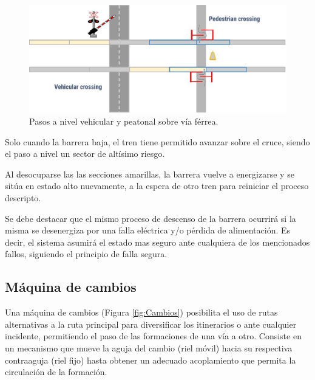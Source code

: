 			\begin{figure}[h!]
				\centering
				\includegraphics[scale=0.4]{./Figures/Paso a nivel}
				\caption{Pasos a nivel vehicular y peatonal sobre vía férrea.}
				\label{fig:Paso_a_nivel}
			\end{figure}
			
			Solo cuando la barrera baja, el tren tiene permitido avanzar sobre el cruce, siendo el paso a nivel un sector de altísimo riesgo.
			
			Al desocuparse las las secciones amarillas, la barrera vuelve a energizarse y se sitúa en estado alto nuevamente, a la espera de otro tren para reiniciar el proceso descripto.
						
			Se debe destacar que el mismo proceso de descenso de la barrera ocurrirá si la misma se desenergiza por una falla eléctrica y/o pérdida de alimentación. Es decir, el sistema asumirá el estado mas seguro ante cualquiera de los mencionados fallos, siguiendo el principio de falla segura.
		
		\subsection{Máquina de cambios}
			
			Una máquina de cambios (Figura \ref{fig:Cambios}) posibilita el uso de rutas alternativas a la ruta principal para diversificar los itinerarios o ante cualquier incidente, permitiendo el paso de las formaciones de una vía a otro. Consiste en un mecanismo que mueve la aguja del cambio (riel móvil) hacia su respectiva contraaguja (riel fijo) hasta obtener un adecuado acoplamiento que permita la circulación de la formación.
			
